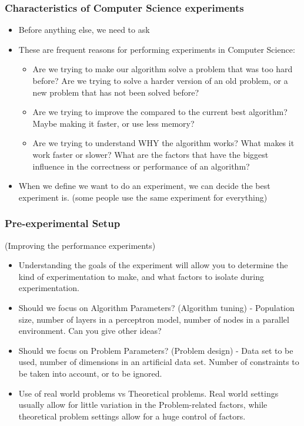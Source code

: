 \documentclass{beamer}
\begin{document}
\begin{frame}
  \frametitle{Characteristics of Computer Science experiments}
  \begin{itemize}
  \item Before anything else, we need to ask 
  \item These are frequent reasons for performing experiments in Computer Science:
    \begin{itemize}
    \item Are we trying to make our algorithm solve a problem that was
      too hard before? Are we trying to solve a harder version of an
      old problem, or a new problem that has not been solved before?
    \item Are we trying to improve the 
      compared to the current best algorithm? Maybe making it faster,
      or use less memory?
    \item Are we trying to understand WHY the algorithm works? What
      makes it work faster or slower? What are the factors that have
      the biggest influence in the correctness or performance of an
      algorithm?
    \end{itemize}
  \item When we define  we want to do an experiment,
    we can decide  the best experiment is. (some
    people use the same experiment for everything)
  \end{itemize}
\end{frame}

\begin{frame}
  \frametitle{Pre-experimental Setup}
  (Improving the performance experiments)
  \begin{itemize}
  \item Understanding the goals of the experiment will allow you to
    determine the kind of experimentation to make, and what factors to
    isolate during experimentation.
  \item Should we focus on Algorithm Parameters? (Algorithm tuning) -
    Population size, number of layers in a perceptron model, number of
    nodes in a parallel environment. Can you give other ideas?
  \item Should we focus on Problem Parameters? (Problem design) - Data
    set to be used, number of dimensions in an artificial data
    set. Number of constraints to be taken into account, or to be
    ignored.
  \item Use of real world problems vs Theoretical problems. Real world
    settings usually allow for little variation in the Problem-related
    factors, while theoretical problem settings allow for a huge
    control of factors.
  \end{itemize}
\end{frame}
\end{document}
